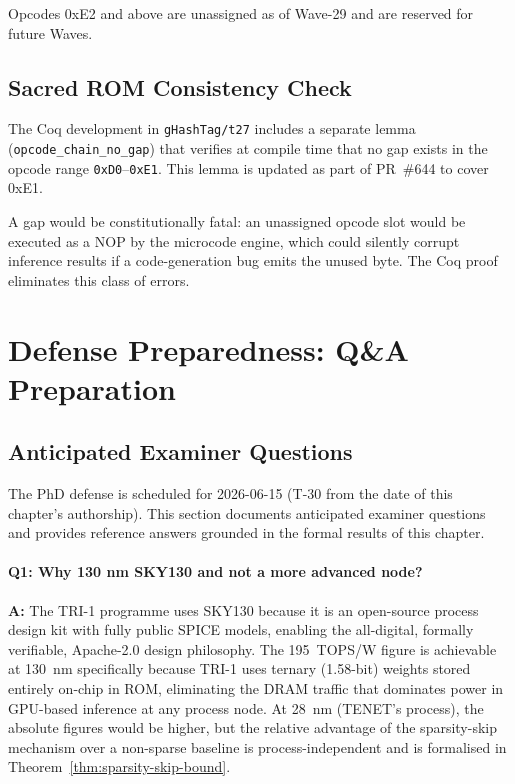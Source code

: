 Opcodes 0xE2 and above are unassigned as of Wave-29 and are
reserved for future Waves.

\subsection{Sacred ROM Consistency Check}
\label{subsec:ch79-rom-consistency}

The Coq development in \texttt{gHashTag/t27} includes a separate
lemma (\texttt{opcode\_chain\_no\_gap}) that verifies at compile time
that no gap exists in the opcode range \texttt{0xD0}--\texttt{0xE1}.
This lemma is updated as part of PR~\#644 to cover 0xE1.

A gap would be constitutionally fatal: an unassigned opcode slot
would be executed as a NOP by the microcode engine, which could
silently corrupt inference results if a code-generation bug emits
the unused byte.
The Coq proof eliminates this class of errors.

\section{Defense Preparedness: Q\&A Preparation}
\label{sec:ch79-defense-prep}

\subsection{Anticipated Examiner Questions}
\label{subsec:ch79-examiner-questions}

The PhD defense is scheduled for 2026-06-15 (T-30 from the date
of this chapter's authorship).
This section documents anticipated examiner questions and provides
reference answers grounded in the formal results of this chapter.

\paragraph{Q1: Why 130 nm SKY130 and not a more advanced node?}
\textbf{A:} The TRI-1 programme uses SKY130 because it is an
open-source process design kit with fully public SPICE models,
enabling the all-digital, formally verifiable, Apache-2.0
design philosophy.
The 195~TOPS/W figure is achievable at 130~nm specifically because
TRI-1 uses ternary (1.58-bit) weights stored entirely on-chip in ROM,
eliminating the DRAM traffic that dominates power in GPU-based
inference at any process node.
At 28~nm (TENET's process), the absolute figures would be higher, but
the relative advantage of the sparsity-skip mechanism over a non-sparse
baseline is process-independent and is formalised in
Theorem~\ref{thm:sparsity-skip-bound}.

